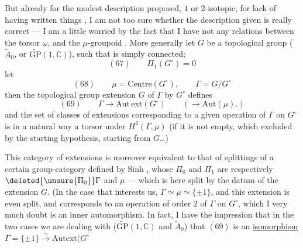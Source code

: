 But already for the modest description proposed,
 $1$ or $2$-isotopic, for lack of having written
things , I am not too sure whether
the description given is really correct --- I
am a little worried by the fact that I have
not  any  relations between the \inserted{$\mu$-}torsor $\omega$,
and the $\mu$-groupoid . More generally let
$G$ be a topological group ($\widetilde A_0$, or $\widetilde{\mathrm{GP}}(1,\mathbb C)$),
such that  is simply connected; 
\[
(67)\qquad\Pi_1(G^\circ)=0
\]
let
\[
(68)\qquad \mu=\mathrm{Centre}(G^\circ),\qquad\Gamma=G/G^\circ
\]
then the topological group extension $G$
of $\Gamma$ by $G^\circ$ defines
\[
(69)\qquad\Gamma\longrightarrow\mathrm{Aut\,ext}(G^\circ)
\qquad(\longrightarrow\mathrm{Aut}(\mu).)
\]
and the set of classes of extensions corresponding
to a given  operation of $\Gamma$ on $G^\circ$
is in a natural way a torsor under
$H^2(\Gamma,\mu)$ (if it is not empty, which  excluded
by the starting hypothesis, starting from $G$\ldots)

This category of extensions is moreover equivalent
to that of splittings of a certain
group-category defined by Sinh , whose $\Pi_0$ and
$\Pi_1$ are respectively $\deleted{\unsure{\Pi_0}}\Gamma$ and $\mu$ --- which
is  here split by the datum of the extension
$G$. (In the case that interests us,
$\Gamma\simeq\mu\simeq\{\pm1\}$, and
this extension is even split, and corresponds
to an operation of order $2$ of $\Gamma$ on $G^\circ$,
which I very much doubt is an inner automorphism.
In fact, I have the impression that in the
two cases we are dealing with ($\widetilde{\mathrm{GP}}(1,\mathbb C)$ and
$\widetilde A_0$) that $(69)$ is an \uline{isomorphism}
$\Gamma=\{\pm1\}\xrightarrow{\sim}\mathrm{Autext}(G^\circ$

